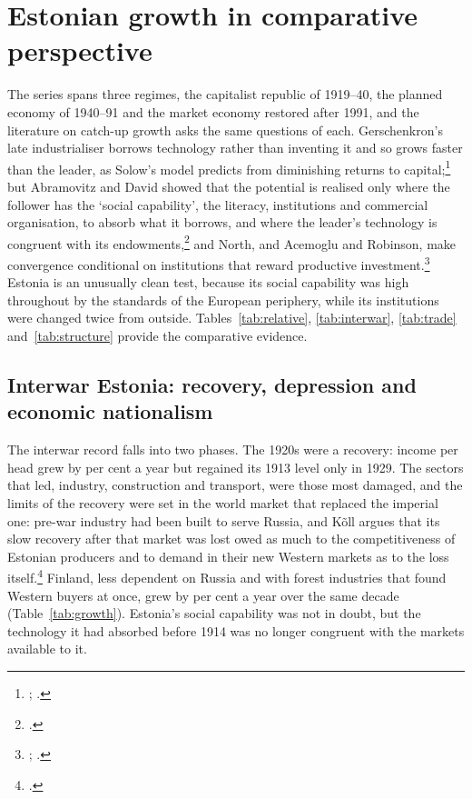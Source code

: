 \section{Estonian growth in comparative perspective}
\label{sec:implications}

The series spans three regimes, the capitalist republic of 1919--40, the planned economy of 1940--91 and the market economy restored after 1991, and the literature on catch-up growth asks the same questions of each. Gerschenkron's late industrialiser borrows technology rather than inventing it and so grows faster than the leader, as Solow's model predicts from diminishing returns to capital;\footnote{\autocite[8]{gerschenkron1962}; \autocite[70--1]{solow1956}.} but Abramovitz and David showed that the potential is realised only where the follower has the `social capability', the literacy, institutions and commercial organisation, to absorb what it borrows, and where the leader's technology is congruent with its endowments,\footnote{\autocite{abramovitz_david1996}.} and North, and Acemoglu and Robinson, make convergence conditional on institutions that reward productive investment.\footnote{\autocite{north1990}; \autocite{acemoglu_whynationsfail}.} Estonia is an unusually clean test, because its social capability was high throughout by the standards of the European periphery, while its institutions were changed twice from outside. Tables~\ref{tab:relative}, \ref{tab:interwar}, \ref{tab:trade} and~\ref{tab:structure} provide the comparative evidence.



\subsection{Interwar Estonia: recovery, depression and economic nationalism}

The interwar record falls into two phases. The 1920s were a recovery: income per head grew by  per cent a year but regained its 1913 level only in 1929. The sectors that led, industry, construction and transport, were those most damaged, and the limits of the recovery were set in the world market that replaced the imperial one: pre-war industry had been built to serve Russia, and Kõll argues that its slow recovery after that market was lost owed as much to the competitiveness of Estonian producers and to demand in their new Western markets as to the loss itself.\footnote{\autocite[199--200]{koll1994gap}.} Finland, less dependent on Russia and with forest industries that found Western buyers at once, grew by  per cent a year over the same decade (Table~\ref{tab:growth}). Estonia's social capability was not in doubt, but the technology it had absorbed before 1914 was no longer congruent with the markets available to it.

